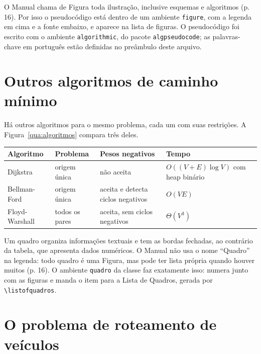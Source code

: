 \documentclass[eq,capa]{texufpel}
\begin{document}
O Manual chama de Figura toda ilustração, inclusive esquemas e algoritmos
(p. 16). Por isso o pseudocódigo está dentro de um ambiente \texttt{figure},
com a legenda em cima e a fonte embaixo, e aparece na lista de figuras. O
pseudocódigo foi escrito com o ambiente \texttt{algorithmic}, do pacote
\texttt{algpseudocode}; as palavras-chave em português estão definidas no
preâmbulo deste arquivo.

\section{Outros algoritmos de caminho mínimo}
\label{sec:outros}

Há outros algoritmos para o mesmo problema, cada um com suas restrições. A
Figura~\ref{qua:algoritmos} compara três deles.

\begin{quadro}[htbp]
  \caption{Comparação entre algoritmos de caminho mínimo}
  \label{qua:algoritmos}
  \centering
  \begin{tabular}{|p{2.8cm}|p{2.6cm}|p{4.4cm}|p{4.2cm}|}
    \hline
    \textbf{Algoritmo} & \textbf{Problema} & \textbf{Pesos negativos} & \textbf{Tempo} \\ \hline
    Dijkstra       & origem única       & não aceita & $O((V + E) \log V)$ com heap binário \\ \hline
    Bellman-Ford   & origem única       & aceita e detecta ciclos negativos & $O(VE)$ \\ \hline
    Floyd-Warshall & todos os pares     & aceita, sem ciclos negativos & $\Theta(V^3)$ \\ \hline
  \end{tabular}
  \caption*{Fonte: Elaborado pela autora (2028), com base em \citet{Cormen:2022:IA}.}
\end{quadro}

Um quadro organiza informações textuais e tem as bordas fechadas, ao
contrário da tabela, que apresenta dados numéricos. O Manual não usa o nome
``Quadro'' na legenda: todo quadro é uma Figura, mas pode ter lista própria
quando houver muitos (p. 16). O ambiente \texttt{quadro} da classe faz
exatamente isso: numera junto com as figuras e manda o item para a Lista de
Quadros, gerada por \verb|\listofquadros|.

\section{O problema de roteamento de veículos}
\label{sec:vrp}
\end{document}
